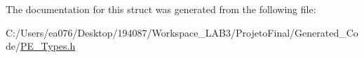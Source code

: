 The documentation for this struct was generated from the following file\-:\begin{DoxyCompactItemize}
\item 
C\-:/\-Users/ea076/\-Desktop/194087/\-Workspace\-\_\-\-L\-A\-B3/\-Projeto\-Final/\-Generated\-\_\-\-Code/\hyperlink{_p_e___types_8h}{P\-E\-\_\-\-Types.\-h}\end{DoxyCompactItemize}
